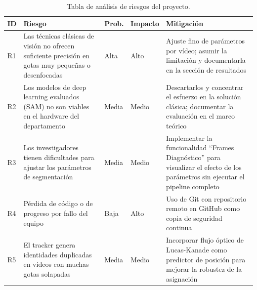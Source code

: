 \begin{table}[H]
\centering
\small
\caption{Tabla de análisis de riesgos del proyecto.}
\begin{tabular}{p{0.3cm} p{4.2cm} p{1.5cm} p{1.3cm} p{5.5cm}}
\hline
\textbf{ID} & \textbf{Riesgo} & \textbf{Prob.} & \textbf{Impacto} & \textbf{Mitigación} \\
\hline
R1 & Las técnicas clásicas de visión no ofrecen suficiente precisión en gotas muy pequeñas o desenfocadas & Alta & Alto & Ajuste fino de parámetros por vídeo; asumir la limitación y documentarla en la sección de resultados \\
\hline
R2 & Los modelos de deep learning evaluados (SAM) no son viables en el hardware del departamento & Media & Medio & Descartarlos y concentrar el esfuerzo en la solución clásica; documentar la evaluación en el marco teórico \\
\hline
R3 & Los investigadores tienen dificultades para ajustar los parámetros de segmentación & Media & Medio & Implementar la funcionalidad ``Frames Diagnóstico'' para visualizar el efecto de los parámetros sin ejecutar el pipeline completo \\
\hline
R4 & Pérdida de código o de progreso por fallo del equipo & Baja & Alto & Uso de Git con repositorio remoto en GitHub como copia de seguridad continua \\
\hline
R5 & El tracker genera identidades duplicadas en vídeos con muchas gotas solapadas & Media & Medio & Incorporar flujo óptico de Lucas-Kanade como predictor de posición para mejorar la robustez de la asignación \\
\hline
\end{tabular}
\label{tab:riesgos}
\end{table}

